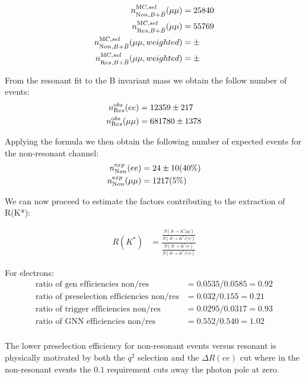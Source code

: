 \begin{align}
  n_{{\textrm Non},{B+\bar B}}^{\textrm MC,sel}(\mu\mu) &= 25840\\
  n_{{\textrm Res},{B+\bar B}}^{\textrm MC,sel}(\mu\mu) &= 55769\\
  n_{{\textrm Non},B+\bar{B}}^{\textrm MC, sel}(\mu\mu,weighted) &=  \pm \\
  n_{{\textrm Res},B+\bar{B}}^{\textrm MC, sel}(\mu\mu,weighted) &=  \pm 
\end{align}


From the resonant fit to the B invariant mass we obtain the follow
number of events:
\begin{align}
  n^{\textrm obs}_{\textrm Res}(ee) &= 12359 \pm 217 \\
  n^{\textrm obs}_{\textrm Res}(\mu\mu) &= 681780 \pm 1378\\
\end{align}

Applying the formula we then obtain the following number of expected
events for the non-resonant channel:
\begin{align}
  n^{\textrm exp}_{\textrm Non}(ee) &= 24 \pm 10 (40\%)\\
  n^{\textrm exp}_{\textrm Non}(\mu\mu) &= 1217 (5\%)\\
\end{align}

We can now proceed to estimate the factors contributing to the
extraction of R(K*):

\begin{align}
  R(K^\ast) &= \frac{\frac{\mathcal{B}(B\to K^\ast\mu\mu)}{\mathcal{B}(B\to K^\ast J/\psi)}}
  {\frac{\mathcal{B}(B\to K^\ast ee)}{\mathcal{B}(B\to K^\ast J/\psi)}}
\end{align}

For electrons:
\begin{align}
  {\textrm{ratio of gen efficiencies non/res}} &=  0.0535/0.0585 = 0.92  \\
  {\textrm{ratio of preselection efficiencies non/res}} &= 0.032/0.155 = 0.21 \\
  {\textrm{ratio of trigger efficiencies non/res}} &=  0.0295/0.0317 = 0.93\\
  {\textrm{ratio of GNN efficiencies non/res}} &=  0.552 / 0.540 = 1.02 \\
\end{align}

The lower preselection efficiency for non-resonant events versus resonant is
physically motivated by both the $q^2$ selection and the $\Delta R(ee)$ cut where in the
non-resonant events the $0.1$ requirement cuts away the photon pole at zero.

